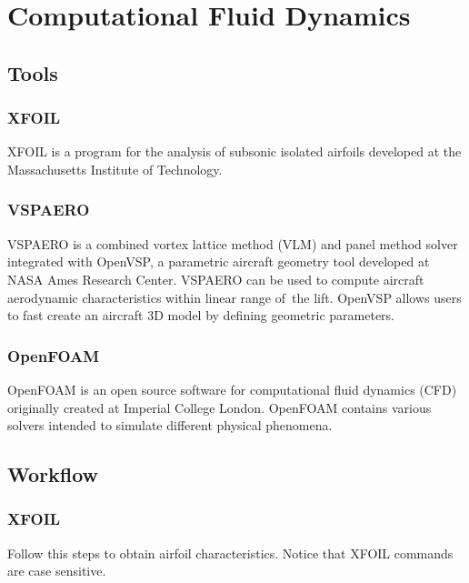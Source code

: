\chapter{Computational Fluid Dynamics}

\section{Tools}

\subsection{XFOIL}

XFOIL is a program for the analysis of subsonic isolated airfoils developed at the Massachusetts Institute of Technology.

\subsection{VSPAERO}

VSPAERO is a combined vortex lattice method (VLM) and panel method solver integrated with OpenVSP, a parametric aircraft geometry tool developed at NASA Ames Research Center. VSPAERO can be used to compute aircraft aerodynamic characteristics within linear range of the lift. \cite{Litherland2015-1} OpenVSP allows users to fast create an aircraft 3D model by defining geometric parameters.

\subsection{OpenFOAM}

OpenFOAM is an open source software for computational fluid dynamics (CFD) originally created at Imperial College London. OpenFOAM contains various solvers intended to simulate different physical phenomena.

\section{Workflow}

\subsection{XFOIL}

Follow this steps to obtain airfoil characteristics. Notice that XFOIL commands are case sensitive. \cite{DrelaYoungren2001}

